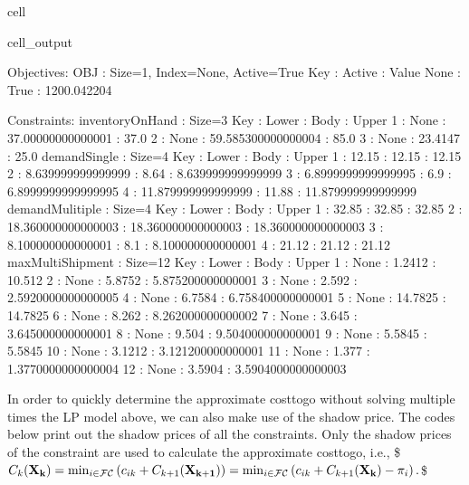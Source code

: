 \documentclass[letterpaper,10pt,english]{jupyterBook}
\begin{document}
\begin{sphinxuseclass}{cell}
\begin{sphinxVerbatimOutput}
\begin{sphinxuseclass}{cell_output}
\begin{sphinxVerbatim}[commandchars=\\\{\}]
  Objectives:
    OBJ : Size=1, Index=None, Active=True
        Key  : Active : Value
        None :   True : 1200.042204

  Constraints:
    inventoryOnHand : Size=3
        Key : Lower : Body               : Upper
          1 :  None :  37.00000000000001 :  37.0
          2 :  None : 59.585300000000004 :  85.0
          3 :  None :            23.4147 :  25.0
    demandSingle : Size=4
        Key : Lower              : Body  : Upper
          1 :              12.15 : 12.15 :              12.15
          2 :  8.639999999999999 :  8.64 :  8.639999999999999
          3 : 6.8999999999999995 :   6.9 : 6.8999999999999995
          4 : 11.879999999999999 : 11.88 : 11.879999999999999
    demandMulitiple : Size=4
        Key : Lower              : Body               : Upper
          1 :              32.85 :              32.85 :              32.85
          2 : 18.360000000000003 : 18.360000000000003 : 18.360000000000003
          3 :  8.100000000000001 :                8.1 :  8.100000000000001
          4 :              21.12 :              21.12 :              21.12
    maxMultiShipment : Size=12
        Key : Lower : Body    : Upper
          1 :  None :  1.2412 :             10.512
          2 :  None :  5.8752 :  5.875200000000001
          3 :  None :   2.592 : 2.5920000000000005
          4 :  None :  6.7584 :  6.758400000000001
          5 :  None : 14.7825 :            14.7825
          6 :  None :   8.262 :  8.262000000000002
          7 :  None :   3.645 :  3.645000000000001
          8 :  None :   9.504 :  9.504000000000001
          9 :  None :  5.5845 :             5.5845
         10 :  None :  3.1212 :  3.121200000000001
         11 :  None :   1.377 : 1.3770000000000004
         12 :  None :  3.5904 : 3.5904000000000003
\end{sphinxVerbatim}

\end{sphinxuseclass}\end{sphinxVerbatimOutput}

\end{sphinxuseclass}
\sphinxAtStartPar
In order to quickly determine the approximate cost\sphinxhyphen{}to\sphinxhyphen{}go without solving multiple times the LP model above, we can also make use of the shadow price. The codes below print out the shadow prices of all the constraints. Only the shadow prices of the constraint  are used to calculate the approximate cost\sphinxhyphen{}to\sphinxhyphen{}go, i.e., \$\(C_{k}({\bf X_k})=\min_{i\in \mathcal{FC}}\left({c_{ik}+C_{k+1}({\bf X_{k+1}})}\right)=\min_{i\in \mathcal{FC}}\left({c_{ik}+C_{k+1}({\bf X_{k}})-\pi_{i}}\right).\)\$
\end{document}
